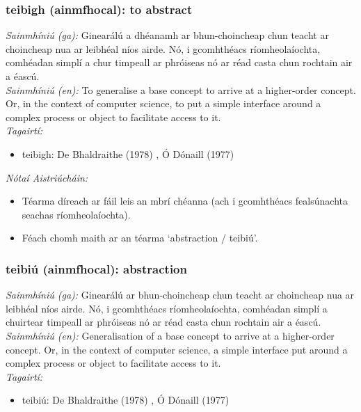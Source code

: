 \documentclass{article}
\begin{document}
\subsubsection*{teibigh (ainmfhocal): to abstract}
 \noindent \textit{Sainmhíniú (ga):} Ginearálú a dhéanamh ar bhun-choincheap chun teacht ar choincheap nua ar leibhéal níos airde. Nó, i gcomhthéacs ríomheolaíochta, comhéadan simplí a chur timpeall ar phróiseas nó ar réad casta chun rochtain air a éascú.
\\
 \noindent \textit{Sainmhíniú (en):} To generalise a base concept to arrive at a higher-order concept. Or, in the context of computer science, to put a simple interface around a complex process or object to facilitate access to it.
\\
 \noindent \textit{Tagairtí:}
\begin{itemize}
	\item teibigh: De Bhaldraithe (1978) \cite{de-bhaldraithe}, Ó Dónaill (1977) \cite{odonaill}
\end{itemize}

 \noindent \textit{Nótaí Aistriúcháin:}
\begin{itemize}
	\item Téarma díreach ar fáil leis an mbrí chéanna (ach i gcomhthéacs fealsúnachta seachas ríomheolaíochta).
	\item Féach chomh maith ar an téarma `abstraction / teibiú'.
\end{itemize}


\subsubsection*{teibiú (ainmfhocal): abstraction}
 \noindent \textit{Sainmhíniú (ga):} Ginearálú ar bhun-choincheap chun teacht ar choincheap nua ar leibhéal níos airde. Nó, i gcomhthéacs ríomheolaíochta, comhéadan simplí a chuirtear timpeall ar phróiseas nó ar réad casta chun rochtain air a éascú.
\\
 \noindent \textit{Sainmhíniú (en):} Generalisation of a base concept to arrive at a higher-order concept. Or, in the context of computer science, a simple interface put around a complex process or object to facilitate access to it.
\\
 \noindent \textit{Tagairtí:}
\begin{itemize}
	\item teibiú: De Bhaldraithe (1978) \cite{de-bhaldraithe}, Ó Dónaill (1977) \cite{odonaill}
\end{itemize}
\end{document}
